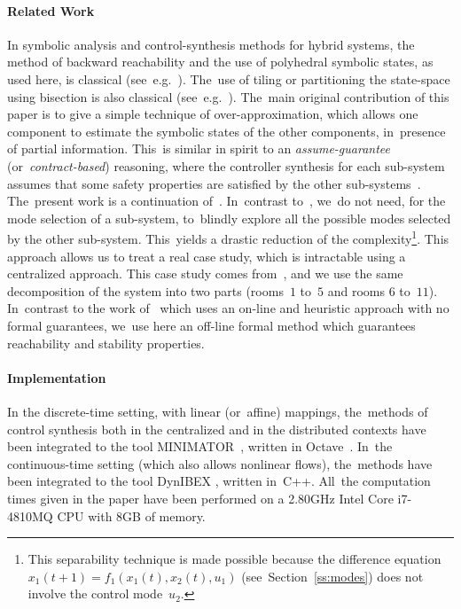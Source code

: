 \paragraph{Related Work}
In symbolic analysis and control-synthesis methods for hybrid systems,
the method of backward reachability and the use of polyhedral symbolic
states, as used here, is classical
(see~e.g.~\cite{asarin2000effective,gillula2011applications}). The~use
of tiling or partitioning the state-space using bisection is also
classical (see~e.g.~\cite{jaulinbook,girard2012low}).  The~main
original contribution of this paper is to give a simple technique of
over-approximation, which allows one component to estimate the
symbolic states of the other components, in~presence of partial
information. This~is similar in spirit to an \emph{assume-guarantee}
(or~\emph{contract-based}) reasoning, where the controller synthesis
for each sub-system assumes that some safety properties are satisfied
by the other
sub-systems~\cite{alur1999reactive,BogomolovFGGPPS14,DallalT15,fribourg2015games,KimAS15,meyer2015safety,Sangiovanni-VincentelliDP12,SmithNO16}.
The~present work is a continuation of~\cite{fribourg2015games}.
In~contrast to~\cite{fribourg2015games}, we~do not need, for the mode
selection of a sub-system, to~blindly explore all the possible modes
selected by the other sub-system.  This~yields a drastic reduction
of the complexity\footnote{This separability technique is made
  possible because the difference equation
  $x_1(t+1)=f_1(x_1(t),x_2(t),u_1)$ (see~Section~\ref{ss:modes}) does
  not involve the control mode~$u_2$.}.  This approach allows us to
treat a real case study, which is intractable using a centralized
approach.  This case study comes from~\cite{larsen2015online}, and we
use the same decomposition of the system into two parts (rooms~$1$
to~$5$ and rooms $6$ to~$11$).  In~contrast to the work
of~\cite{larsen2015online} which uses an on-line and heuristic
approach with no formal guarantees, we~use here an off-line formal
method which guarantees reachability and stability properties.
% 
% 
% 
%

\paragraph{Implementation}
In the discrete-time setting, with linear (or~affine) mappings,
the~methods of control synthesis both in the centralized and in the
distributed contexts have been integrated to the tool
MINIMATOR~\cite{minimator,fribourg2014finite}, written in
Octave~\cite{octave}.  In~the continuous-time setting (which also allows
nonlinear flows), the~methods have been integrated to the tool DynIBEX
\cite{dynibex,dit2016validated}, written in~C++.  All~the computation
times given in the paper have been performed on a 2.80GHz Intel Core
i7-4810MQ CPU with 8GB of memory.


